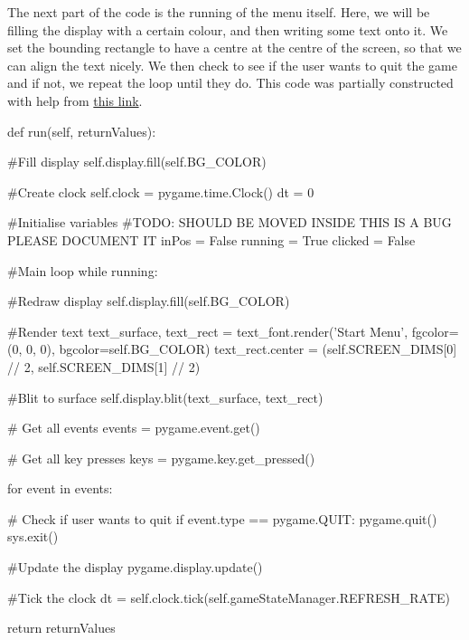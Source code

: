 \vs
The next part of the code is the running of the menu itself. Here, we will be filling the display with a certain colour, and then writing some text onto it. We set the bounding rectangle to have a centre at the centre of the screen, so that we can align the text nicely. We then check to see if the user wants to quit the game and if not, we repeat the loop until they do. This code was partially constructed with help from \href{https://stackoverflow.com/questions/23982907/how-to-center-text-in-pygame}{this link}.

\vs
\begin{mpy}
    def run(self, returnValues):

        #Fill display
        self.display.fill(self.BG_COLOR)

        #Create clock
        self.clock = pygame.time.Clock()
        dt = 0

        #Initialise variables
        #TODO: SHOULD BE MOVED INSIDE THIS IS A BUG PLEASE DOCUMENT IT
        inPos = False
        running = True
        clicked = False

        #Main loop
        while running:

            #Redraw display
            self.display.fill(self.BG_COLOR)

            #Render text
            text_surface, text_rect = text_font.render('Start Menu', fgcolor=(0, 0, 0), bgcolor=self.BG_COLOR)
            text_rect.center = (self.SCREEN_DIMS[0] // 2, self.SCREEN_DIMS[1] // 2)

            #Blit to surface
            self.display.blit(text_surface, text_rect)

            # Get all events
            events = pygame.event.get()

            # Get all key presses
            keys = pygame.key.get_pressed()
            
            for event in events:

                    # Check if user wants to quit
                    if event.type == pygame.QUIT:
                            pygame.quit()
                            sys.exit()

            #Update the display
            pygame.display.update()

            #Tick the clock
            dt = self.clock.tick(self.gameStateManager.REFRESH_RATE)
                
        return returnValues
\end{mpy}

